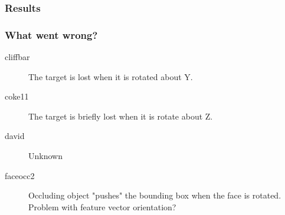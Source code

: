 \begin{frame}
    \frametitle{Results}
    \begin{center}
        
    \end{center}
\end{frame}

\begin{frame}
    \frametitle{What went wrong?}
    \begin{description}
        \item [cliffbar] The target is lost when it is rotated about Y.
        \item [coke11] The target is briefly lost when it is rotate about Z.
        \item [david] Unknown
        \item [faceocc2] Occluding object "pushes" the bounding box when the face is rotated.
            Problem with feature vector orientation?
    \end{description}
\end{frame}

%

